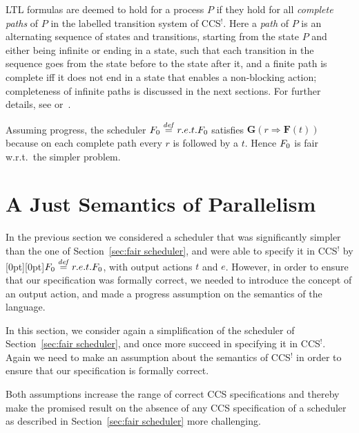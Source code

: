 \documentclass[smallcondensed]{svjour3}
\newcommand{\plat}[1]{\raisebox{0pt}[0pt][0pt]{#1}}  \def\precond#1{{\vphantom{#1}}^\bullet #1}
\newcommand{\Sect}[1]{Section~\ref{sec:#1}}
\begin{document}
LTL formulas are deemed to hold for a process $P$ if they hold for all \emph{complete
paths} of $P$ in the labelled transition system of CCS$^!\!$. Here a \emph{path} of
$P$ is an alternating sequence of states and transitions, starting from the state $P$ and
either being infinite or ending in a state, such that each transition in the sequence goes from the
state before to the state after it, and a finite path is complete iff it does not end in a state that
enables a non-blocking action; completeness of infinite paths is discussed in the next
sections. For further details, see \cite[Section 9.1]{TR13} or~\cite{GH14}.

Assuming progress,
the scheduler $F_{0} \stackrel{{\it def}}{=} r.e.t.F_{0}$ 
satisfies $\mathbf{G}(r \Rightarrow \mathbf{F}(t))$ because on each complete
  path every $r$ is followed by a $t$. Hence $F_{0}$ is fair w.r.t.\ the simpler problem.

\section{A Just Semantics of Parallelism}\label{sec:justness}


In the previous section we considered a scheduler\vspace{2pt} that was significantly simpler than the one of
\Sect{fair scheduler}, and were able to specify it in CCS$^!\!$ by \plat{$F_{0} \stackrel{{\it def}}{=} r.e.t.F_{0}$}, with output actions $t$ and $e$. 
However, in order to ensure that our
specification was formally correct, we needed to introduce the concept of an output action, and made
a progress assumption on the semantics of the language.

In this section, we consider again a simplification of the scheduler of \Sect{fair scheduler}, and
once more succeed in specifying it in CCS$^!\!$. Again we need to make an assumption about the semantics
of CCS$^!$ in order to ensure that our specification is formally correct.

Both assumptions increase the range of correct CCS specifications and thereby make the promised
result on the absence of any CCS specification of a scheduler as described in \Sect{fair scheduler}
more challenging.
\end{document}
